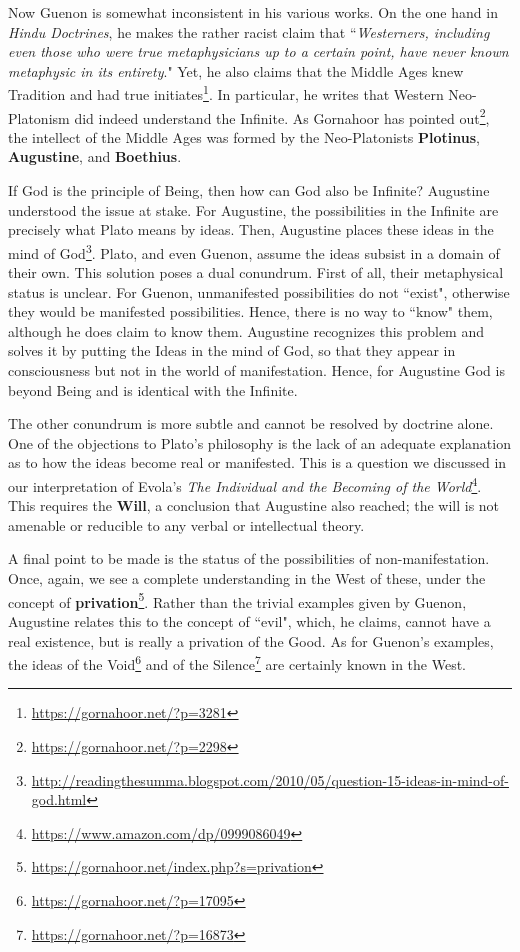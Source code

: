 Now Guenon is somewhat inconsistent in his various works. On the one hand in \textit{Hindu Doctrines}, he makes the rather racist claim that ``\emph{Westerners, including even those who were true metaphysicians up to a certain point, have never known metaphysic in its entirety}." Yet, he also claims that the Middle Ages knew Tradition and had true initiates\footnote{\url{https://gornahoor.net/?p=3281}}. In particular, he writes that Western Neo-Platonism did indeed understand the Infinite. As Gornahoor has pointed out\footnote{\url{https://gornahoor.net/?p=2298}}, the intellect of the Middle Ages was formed by the Neo-Platonists \textbf{Plotinus}, \textbf{Augustine}, and \textbf{Boethius}.

If God is the principle of Being, then how can God also be Infinite? Augustine understood the issue at stake. For Augustine, the possibilities in the Infinite are precisely what Plato means by ideas. Then, Augustine places these ideas in the mind of God\footnote{\url{http://readingthesumma.blogspot.com/2010/05/question-15-ideas-in-mind-of-god.html}}. Plato, and even Guenon, assume the ideas subsist in a domain of their own. This solution poses a dual conundrum. First of all, their metaphysical status is unclear. For Guenon, unmanifested possibilities do not ``exist", otherwise they would be manifested possibilities. Hence, there is no way to ``know" them, although he does claim to know them. Augustine recognizes this problem and solves it by putting the Ideas in the mind of God, so that they appear in consciousness but not in the world of manifestation. Hence, for Augustine God is beyond Being and is identical with the Infinite.

The other conundrum is more subtle and cannot be resolved by doctrine alone. One of the objections to Plato's philosophy is the lack of an adequate explanation as to how the ideas become real or manifested. This is a question we discussed in our interpretation of Evola's \textit{The Individual and the Becoming of the World}\footnote{\url{https://www.amazon.com/dp/0999086049}}. This requires the \textbf{Will}, a conclusion that Augustine also reached; the will is not amenable or reducible to any verbal or intellectual theory.

A final point to be made is the status of the possibilities of non-manifestation. Once, again, we see a complete understanding in the West of these, under the concept of \textbf{privation}\footnote{\url{https://gornahoor.net/index.php?s=privation}}. Rather than the trivial examples given by Guenon, Augustine relates this to the concept of ``evil", which, he claims, cannot have a real existence, but is really a privation of the Good. As for Guenon's examples, the ideas of the Void\footnote{\url{https://gornahoor.net/?p=17095}} and of the Silence\footnote{\url{https://gornahoor.net/?p=16873}} are certainly known in the West.


